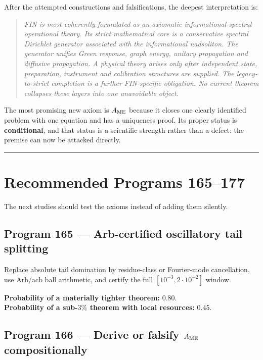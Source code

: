 \documentclass[11pt,a4paper,openany]{report}
\begin{document}
After the attempted constructions and falsifications, the deepest interpretation is:

\begin{quote}\itshape
FIN is most coherently formulated as an axiomatic informational-spectral operational theory. Its strict mathematical core is a conservative spectral Dirichlet generator associated with the informational nadsoliton. The generator unifies Green response, graph energy, unitary propagation and diffusive propagation. A physical theory arises only after independent state, preparation, instrument and calibration structures are supplied. The legacy-to-strict completion is a further FIN-specific obligation. No current theorem collapses these layers into one unavoidable object.

\end{quote}

The most promising new axiom is \(A_{\rm ME}\) because it closes one clearly identified problem with one equation and has a uniqueness proof. Its proper status is \textbf{conditional}, and that status is a scientific strength rather than a defect: the premise can now be attacked directly.

\par\medskip\hrule\medskip

\chapter{Recommended Programs 165--177}

The next studies should test the axioms instead of adding them silently.

\section{Program 165 --- Arb-certified oscillatory tail splitting}

Replace absolute tail domination by residue-class or Fourier-mode cancellation, use Arb/\allowbreak{}acb ball arithmetic, and certify the full \([10^{-3},2\cdot10^{-2}]\) window.

\textbf{Probability of a materially tighter theorem:} 0.80.\\
\textbf{Probability of a sub-\(3\%\) theorem with local resources:} 0.45.

\section{\texorpdfstring{Program 166 --- Derive or falsify \(A_{\rm ME}\) compositionally}{Program 166 --- Derive or falsify A\_ ME compositionally}}
\end{document}
